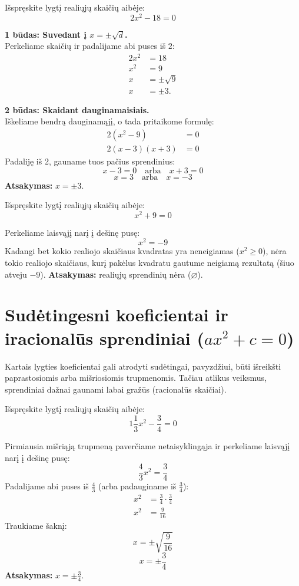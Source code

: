 \documentclass[11pt,a4paper]{scrartcl}
\begin{document}
\begin{example}
Išspręskite lygtį realiųjų skaičių aibėje:
\[ 2x^2 - 18 = 0 \]
\end{example}
\begin{solution}
\textbf{1 būdas: Suvedant į $x = \pm\sqrt{d}$.}\\
Perkeliame skaičių ir padalijame abi puses iš $2$:
\[
\begin{aligned}
2x^2 &= 18 \\
x^2 &= 9 \\
x &= \pm\sqrt{9} \\
x &= \pm 3.
\end{aligned}
\]

\textbf{2 būdas: Skaidant dauginamaisiais.}\\
Iškeliame bendrą dauginamąjį, o tada pritaikome formulę:
\[
\begin{aligned}
2(x^2 - 9) &= 0 \\
2(x-3)(x+3) &= 0
\end{aligned}
\]
Padaliję iš 2, gauname tuos pačius sprendinius:
\[ x-3 = 0 \quad \text{arba} \quad x+3 = 0 \]
\[ x = 3 \quad \text{arba} \quad x = -3 \]
\textbf{Atsakymas:} $x = \pm 3$.
\end{solution}

\begin{example}
Išspręskite lygtį realiųjų skaičių aibėje:
\[ x^2 + 9 = 0 \]
\end{example}
\begin{solution}
Perkeliame laisvąjį narį į dešinę pusę:
\[ x^2 = -9 \]
Kadangi bet kokio realiojo skaičiaus kvadratas yra neneigiamas ($x^2 \ge 0$), nėra tokio realiojo skaičiaus, kurį pakėlus kvadratu gautume neigiamą rezultatą (šiuo atveju $-9$). 
\textbf{Atsakymas:} realiųjų sprendinių nėra ($\varnothing$).
\end{solution}

\section{Sudėtingesni koeficientai ir iracionalūs sprendiniai ($ax^2+c=0$)}

Kartais lygties koeficientai gali atrodyti sudėtingai, pavyzdžiui, būti išreikšti paprastosiomis arba mišriosiomis trupmenomis. Tačiau atlikus veiksmus, sprendiniai dažnai gaunami labai gražūs (racionalūs skaičiai).

\begin{example}
Išspręskite lygtį realiųjų skaičių aibėje:
\[ 1\frac{1}{3}x^2 - \frac{3}{4} = 0 \]
\end{example}
\begin{solution}
Pirmiausia mišriąją trupmeną paverčiame netaisyklingąja ir perkeliame laisvąjį narį į dešinę pusę:
\[ \frac{4}{3}x^2 = \frac{3}{4} \]
Padalijame abi puses iš $\frac{4}{3}$ (arba padauginame iš $\frac{3}{4}$):
\[
\begin{aligned}
x^2 &= \frac{3}{4} \cdot \frac{3}{4} \\
x^2 &= \frac{9}{16}
\end{aligned}
\]
Traukiame šaknį:
\[ x = \pm\sqrt{\frac{9}{16}} \]
\[ x = \pm\frac{3}{4} \]
\textbf{Atsakymas:} $x = \pm\frac{3}{4}$.
\end{solution}
\end{document}
